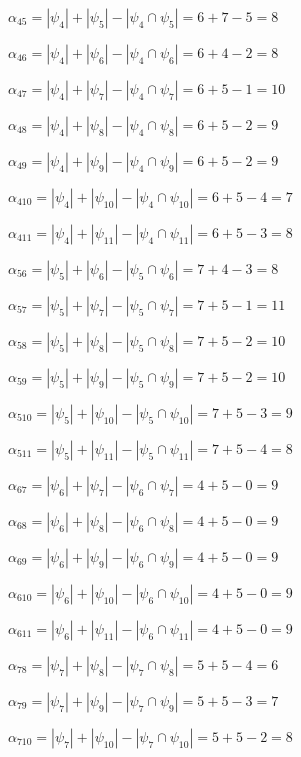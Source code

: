 \documentclass{article}
\begin{document}
$\alpha_{45} = |\psi_{4}| + |\psi_{5}| - |\psi_{4} \cap \psi_{5}| = 6 + 7 - 5 = 8$

$\alpha_{46} = |\psi_{4}| + |\psi_{6}| - |\psi_{4} \cap \psi_{6}| = 6 + 4 - 2 = 8$

$\alpha_{47} = |\psi_{4}| + |\psi_{7}| - |\psi_{4} \cap \psi_{7}| = 6 + 5 - 1 = 10$

$\alpha_{48} = |\psi_{4}| + |\psi_{8}| - |\psi_{4} \cap \psi_{8}| = 6 + 5 - 2 = 9$

$\alpha_{49} = |\psi_{4}| + |\psi_{9}| - |\psi_{4} \cap \psi_{9}| = 6 + 5 - 2 = 9$

$\alpha_{410} = |\psi_{4}| + |\psi_{10}| - |\psi_{4} \cap \psi_{10}| = 6 + 5 - 4 = 7$

$\alpha_{411} = |\psi_{4}| + |\psi_{11}| - |\psi_{4} \cap \psi_{11}| = 6 + 5 - 3 = 8$

$\alpha_{56} = |\psi_{5}| + |\psi_{6}| - |\psi_{5} \cap \psi_{6}| = 7 + 4 - 3 = 8$

$\alpha_{57} = |\psi_{5}| + |\psi_{7}| - |\psi_{5} \cap \psi_{7}| = 7 + 5 - 1 = 11$

$\alpha_{58} = |\psi_{5}| + |\psi_{8}| - |\psi_{5} \cap \psi_{8}| = 7 + 5 - 2 = 10$

$\alpha_{59} = |\psi_{5}| + |\psi_{9}| - |\psi_{5} \cap \psi_{9}| = 7 + 5 - 2 = 10$

$\alpha_{510} = |\psi_{5}| + |\psi_{10}| - |\psi_{5} \cap \psi_{10}| = 7 + 5 - 3 = 9$

$\alpha_{511} = |\psi_{5}| + |\psi_{11}| - |\psi_{5} \cap \psi_{11}| = 7 + 5 - 4 = 8$

$\alpha_{67} = |\psi_{6}| + |\psi_{7}| - |\psi_{6} \cap \psi_{7}| = 4 + 5 - 0 = 9$

$\alpha_{68} = |\psi_{6}| + |\psi_{8}| - |\psi_{6} \cap \psi_{8}| = 4 + 5 - 0 = 9$

$\alpha_{69} = |\psi_{6}| + |\psi_{9}| - |\psi_{6} \cap \psi_{9}| = 4 + 5 - 0 = 9$

$\alpha_{610} = |\psi_{6}| + |\psi_{10}| - |\psi_{6} \cap \psi_{10}| = 4 + 5 - 0 = 9$

$\alpha_{611} = |\psi_{6}| + |\psi_{11}| - |\psi_{6} \cap \psi_{11}| = 4 + 5 - 0 = 9$

$\alpha_{78} = |\psi_{7}| + |\psi_{8}| - |\psi_{7} \cap \psi_{8}| = 5 + 5 - 4 = 6$

$\alpha_{79} = |\psi_{7}| + |\psi_{9}| - |\psi_{7} \cap \psi_{9}| = 5 + 5 - 3 = 7$

$\alpha_{710} = |\psi_{7}| + |\psi_{10}| - |\psi_{7} \cap \psi_{10}| = 5 + 5 - 2 = 8$
\end{document}
